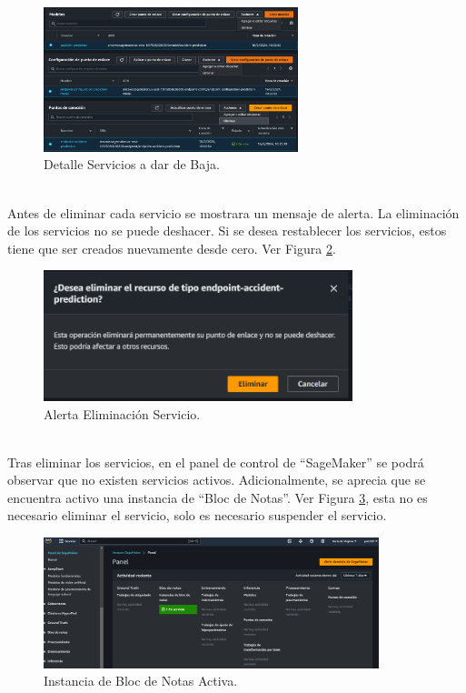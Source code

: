 \documentclass[a4paper,10pt, oneside, titlepage]{article}
\begin{document}
	\begin{figure}[!h]
		\centering
		\includegraphics[width = 1\linewidth, height = 4.2cm]{Detalle_AWS_SageMaker_Servicios_Baja.png}
		\caption{Detalle Servicios a dar de Baja.}
		\label{Detalle_AWS_SageMaker_Servicios_Baja}
	\end{figure} \\
	\indent Antes de eliminar cada servicio se mostrara un mensaje de alerta. La eliminación de los servicios no se puede deshacer. Si se desea restablecer los servicios, estos tiene que ser creados nuevamente desde cero. Ver Figura \ref{Alerta_Eliminacion_Servicio}.
	\begin{figure}[!h]
		\centering
		\includegraphics[width = 1\linewidth, height = 3.8cm]{Alerta_Eliminacion_Servicio.png}
		\caption{Alerta Eliminación Servicio.}
		\label{Alerta_Eliminacion_Servicio}
	\end{figure} \\
	\indent Tras eliminar los servicios, en el panel de control de ``SageMaker'' se podrá observar que no existen servicios activos. Adicionalmente, se aprecia que se encuentra activo una instancia de ``Bloc de Notas''. Ver Figura \ref{AWS_SageMaker_Panel_Eliminacion}, esta no es necesario eliminar el servicio, solo es necesario suspender el servicio.
	\begin{figure}[!h]
		\centering
		\includegraphics[width = 1\linewidth, height = 3.8cm]{AWS_SageMaker_Panel_Eliminacion.png}
		\caption{Instancia de Bloc de Notas Activa.}
		\label{AWS_SageMaker_Panel_Eliminacion}
	\end{figure} \\
\end{document}
